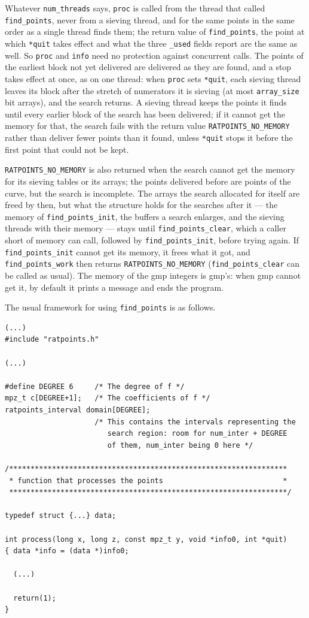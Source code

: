 \documentclass[12pt,a4paper,oneside]{amsart}
\begin{document}
Whatever \texttt{num\_threads} says, \texttt{proc} is called from the
thread that called \texttt{find\_points}, never from a sieving thread, and
for the same points in the same order as a single thread finds them; the
return value of \texttt{find\_points}, the point at which \texttt{*quit}
takes effect and what the three \texttt{\_used} fields report are the same
as well. So \texttt{proc} and \texttt{info} need
no protection against concurrent calls. The points of the earliest block
not yet delivered are delivered as they are found, and a stop takes effect
at once, as on one thread: when \texttt{proc} sets \texttt{*quit}, each
sieving thread leaves its block after the stretch of numerators it is
sieving (at most \texttt{array\_size} bit arrays), and the search returns.
A sieving thread keeps the points
it finds until every earlier block of the search has been delivered; if it
cannot get the memory for that, the search fails with the return value
\texttt{RATPOINTS\_NO\_MEMORY} rather than deliver fewer points than it
found, unless \texttt{*quit} stops it before the first point that could
not be kept.

\texttt{RATPOINTS\_NO\_MEMORY} is also returned when the search cannot get
the memory for its sieving tables or its arrays; the points delivered
before are points of the curve, but the search is incomplete. The arrays
the search allocated for itself are freed by then, but what the structure
holds for the searches after it --- the memory of
\texttt{find\_points\_init}, the buffers a search enlarges, and the sieving
threads with their memory --- stays until \texttt{find\_points\_clear},
which a caller short of memory can call, followed by
\texttt{find\_points\_init}, before trying again. If
\texttt{find\_points\_init} cannot get its memory, it frees what it got,
and \texttt{find\_points\_work} then returns \texttt{RATPOINTS\_NO\_MEMORY}
(\texttt{find\_points\_clear} can be called as usual). The memory of the
gmp integers is gmp's: when gmp cannot get it, by default it prints a
message and ends the program.

The usual framework for using \texttt{find\_points} is as follows.

\begin{verbatim}
(...)
#include "ratpoints.h"

(...)

#define DEGREE 6     /* The degree of f */
mpz_t c[DEGREE+1];   /* The coefficients of f */
ratpoints_interval domain[DEGREE];
                     /* This contains the intervals representing the
                        search region: room for num_inter + DEGREE
                        of them, num_inter being 0 here */

/*****************************************************************
 * function that processes the points                            *
 *****************************************************************/

typedef struct {...} data;

int process(long x, long z, const mpz_t y, void *info0, int *quit)
{ data *info = (data *)info0;

  (...)

  return(1);
}
\end{verbatim}
\end{document}
